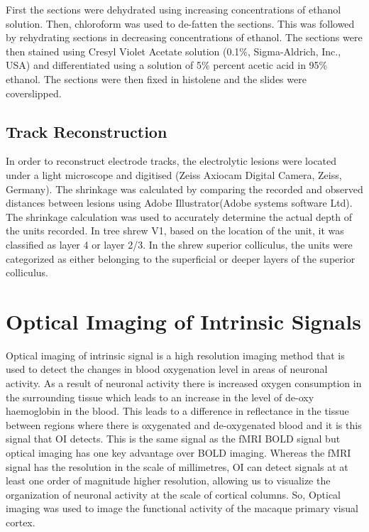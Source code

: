 	First the sections were dehydrated using increasing concentrations of ethanol solution. Then, chloroform was used to de-fatten the sections. This was followed by rehydrating sections in decreasing concentrations of ethanol. The sections were then stained using Cresyl Violet Acetate solution (0.1\%, Sigma-Aldrich, Inc., USA) and differentiated using a solution of 5\% percent acetic acid in 95\% ethanol. The sections were then fixed in histolene and the slides were coverslipped.
	
	\subsection{Track Reconstruction}
	
	In order to reconstruct electrode tracks, the electrolytic lesions were located under a light microscope and digitised (Zeiss Axiocam Digital Camera, Zeiss, Germany). The shrinkage was calculated by comparing the recorded and observed distances between lesions using Adobe Illustrator(Adobe systems software Ltd). The shrinkage calculation was used to accurately determine the actual depth of the units recorded. In tree shrew V1, based on the location of the unit, it was classified as layer 4 or layer 2/3. In the shrew superior colliculus, the units were categorized as either belonging to the superficial or deeper layers of the superior colliculus.
	
	\section{Optical Imaging of Intrinsic Signals}
	
	Optical imaging of intrinsic signal is a high resolution imaging method that is used to detect the changes in blood oxygenation level in areas of neuronal activity. As a result of neuronal activity there is increased oxygen consumption in the surrounding tissue which leads to an increase in the level of de-oxy haemoglobin in the blood. This leads to a difference in reflectance in the tissue between regions where there is oxygenated and de-oxygenated blood and it is this signal that OI detects. This is the same signal as the fMRI BOLD signal but optical imaging has one key advantage over BOLD imaging. Whereas the fMRI signal has the resolution in the scale of millimetres, OI can detect  signals at at least one order of magnitude higher resolution, allowing us to visualize the organization of neuronal activity at the scale of cortical columns. So, Optical imaging was used to image the functional activity of the macaque primary visual cortex. 

